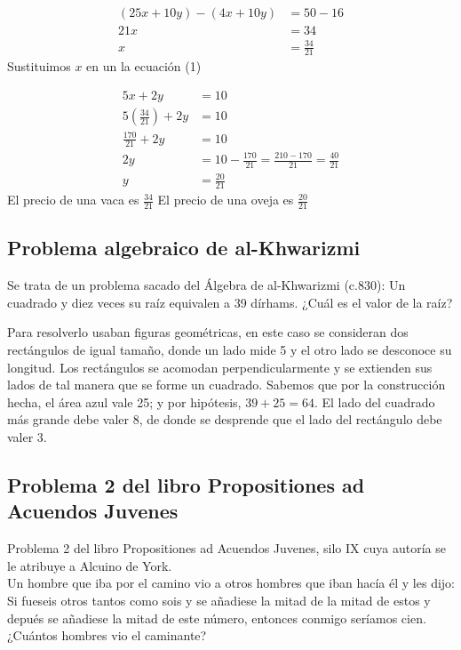 \begin{align*}
(25x + 10y) - (4x + 10y) &= 50 - 16 \\
21x &= 34 \\
x &= \frac{34}{21}
\end{align*}
Sustituimos $x$ en un la ecuación (1)

\begin{align*}
5x + 2y &= 10 \\
5\left(\frac{34}{21}\right) + 2y &= 10 \\
\frac{170}{21} + 2y &= 10 \\
2y &= 10 - \frac{170}{21} = \frac{210 - 170}{21} = \frac{40}{21} \\
y &= \frac{20}{21}
\end{align*}
El precio de una vaca es $\frac{34}{21}$
El precio de una oveja es $\frac{20}{21}$

\subsection{Problema algebraico de al-Khwarizmi}
Se trata de un problema sacado del Álgebra de al-Khwarizmi (c.830): Un cuadrado y diez veces su raíz equivalen a 39 dírhams. ¿Cuál es el valor de la raíz?
\par
\begin{minipage}[t]{0.48\textwidth}
Para resolverlo usaban figuras geométricas, en este caso se consideran dos rectángulos de igual tamaño, donde un lado mide 5 y el otro lado se desconoce su longitud.
Los rectángulos se acomodan perpendicularmente y se extienden sus lados de tal manera que se forme un cuadrado. Sabemos que por la construcción hecha, el área azul vale 25; y por hipótesis, $39+25=64$. El lado del cuadrado más grande debe valer 8, de donde se desprende que el lado del rectángulo debe valer 3.
\end{minipage}
\begin{minipage}[t]{0.48\textwidth}
    \begin{center}
        
    \end{center}
\end{minipage}
\par

\subsection{Problema 2 del libro Propositiones ad Acuendos Juvenes}

Problema 2 del libro Propositiones ad Acuendos Juvenes, silo IX cuya autoría se le atribuye a
Alcuino de York.\\ Un hombre que iba por el camino vio a otros hombres que iban hacía él y les dijo: Si fueseis otros tantos como sois y se añadiese la mitad de la mitad de estos y depués se añadiese la mitad de este número, entonces conmigo seríamos cien. ¿Cuántos hombres vio el caminante?


